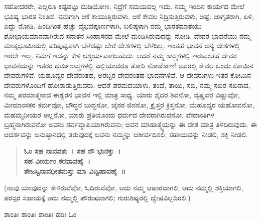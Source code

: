 ಸಹೋದರರೇ, ಎಲ್ಲರೂ ಕಷ್ಟಪಟ್ಟು ದುಡಿಯೋಣ. ನಿದ್ರೆಗೆ ಸಮಯವಲ್ಲ ಇದು. ನಮ್ಮ ಇಂದಿನ ಕಾರ್ಯದ ಮೇಲೆ ಭವಿಷ್ಯ ಭಾರತ ನಿಂತಿದೆ. ನಮಗಾಗಿ ಆಕೆ ಕಾಯುತ್ತಿರು\-ವಳು. ಆಕೆ ಕೇವಲ ನಿದ್ರಿಸುತ್ತಿರುವಳು, ಅಷ್ಟೆ. ಜಾಗೃತರಾಗಿ, ಏಳಿ, ಎದ್ದು ನೋಡಿ. ಹಿಂದಿಗಿಂತ ಹೆಚ್ಚು ವೈಭವಪೂರ್ಣಳಾಗಿ, ಬಲಿಷ್ಠಳಾಗಿ ನಮ್ಮ ಭಾರತಮಾತೆಯು ಶೋಭಾಯಮಾನವಾಗಿರುವ ಸನಾತನ ಸಿಂಹಾಸನದ ಮೇಲೆ ಮಂಡಿಸಿರುವುದನ್ನು ನೋಡಿ. ದೇವರ ಭಾವನೆಯು ನಮ್ಮ ಮಾತೃಭೂಮಿಯಲ್ಲಿ ಪರಿಪುಷ್ಟವಾಗಿ ಬೆಳೆದಷ್ಟು ಬೇರೆ ದೇಶಗಳಲ್ಲಿ ಬೆಳೆದಿಲ್ಲ. ಇಂತಹ ಭಾವನೆ ಅನ್ಯ ದೇಶಗಳಲ್ಲಿ ಇರಲೇ ಇಲ್ಲ. ನಿಮಗೆ ಇದನ್ನು ಕೇಳಿ ಆಶ್ಚರ್ಯವಾಗಬಹುದು. ಆದರೆ ನಮ್ಮ ಶಾಸ್ತ್ರಗಳಲ್ಲಿ ಇರುವಂತಹ ದೇವರ ಭಾವನೆಯನ್ನು ಇತರರ ಧರ್ಮಶಾಸ್ತ್ರಗಳಲ್ಲಿ ಎಲ್ಲಿಯಾದರೂ ತೋರಿ ನೋಡೋಣ! ಅವರಲ್ಲಿ ಕೇವಲ ಒಂದು ಕೋಮಿನ ದೇವರುಗಳಿವೆ. ಯೆಹೂದ್ಯರ ದೇವರಂತಹ, ಅರಬ್ಬರ ದೇವರಂತಹ ಭಾವನೆಗಳಿವೆ. ಆ ದೇವರುಗಳು ಇತರ ಕೋಮಿನ ದೇವರುಗಳೊಂದಿಗೆ ಹೋರಾಡುತ್ತಿರುವರು. ಆದರೆ ಪರಮದಯಾಳು, ತಂದೆ, ತಾಯಿ, ಸಖ, ನಮ್ಮ ಸಖರ ಸಖನಾದ, ನಮ್ಮ ಪರಮಾತ್ಮನಾದ ಈಶ್ವರನ ಭಾವನೆ ಇಲ್ಲಿ ಮಾತ್ರ ಸಾಧ್ಯ. ಯಾರು ಶೈವರ ಶಿವನೋ, ವೈಷ್ಣವರ ವಿಷ್ಣುವೋ, ಮೀಮಾಂಸಕರ ಕರ್ಮವೋ, ಬೌದ್ಧರ ಬುದ್ಧನೋ, ಜೈನರ ಜಿನನೋ, ಕ್ರೈಸ್ತರ ಕ್ರಿಸ್ತನೋ, ಯೆಹೂದ್ಯರ ಯಹೋವನೋ, ಮಹಮ್ಮದೀಯರ ಅಲ್ಲನೋ, ಯಾರು ಪ್ರತಿಯೊಂದು ಧರ್ಮದ ದೇವರಾಗಿರುವನೋ, ವೇದಾಂತಿಗಳ ಬ್ರಹ್ಮನಾಗಿರುವನೋ ಅವನು ಸರ್ವವ್ಯಾಪಿಯಾಗಿರುವನು; ಅವನ ಮಾಹಾತ್ಮ್ಯೆಯನ್ನು ಈ ದೇಶ ಮಾತ್ರ ತಿಳಿದಿರುವುದು. ಈ ಆದರ್ಶವನ್ನು ಅನುಷ್ಠಾನದಲ್ಲಿ ತರುವುದಕ್ಕೆ ಅವನು ನಮ್ಮನ್ನು ಆಶೀರ್ವದಿಸಲಿ, ಸಹಾಯವನ್ನು ನೀಡಲಿ, ಶಕ್ತಿ ನೀಡಲಿ.

\begin{verse}
\textbf{ಓಂ ಸಹ ನಾವವತು~। ಸಹ ನೌ ಭುನಕ್ತು~।\\ಸಹ ವೀರ್ಯಂ ಕರವಾವಹೈ~।}\\\textbf{ತೇಜಸ್ವಿನಾವಧೀತಮಸ್ತು ಮಾ ವಿದ್ವಿಷಾವಹೈ~॥}
\end{verse}

(ನಾವು ಯಾವುದನ್ನು ಕೇಳಿರುವೆವೋ, ಓದಿರುವೆವೋ, ಅದು ನಮ್ಮ ಆಹಾರವಾಗಲಿ, ಅದು ನಮ್ಮಲ್ಲಿ ಶಕ್ತಿಯಾಗಲಿ, ಪರಸ್ಪರ ಸಹಾಯಕ್ಕೆ ಅದು ನಮ್ಮಲ್ಲಿ ಪೌರುಷವಾಗಲಿ; ಗುರುಶಿಷ್ಯರಲ್ಲಿ ದ್ವೇಷವಿಲ್ಲದಿರಲಿ.)

\begin{center}
ಶಾಂತಿಃ ಶಾಂತಿಃ ಶಾಂತಿಃ ಹರಿಃ ಓಂ
\end{center}

